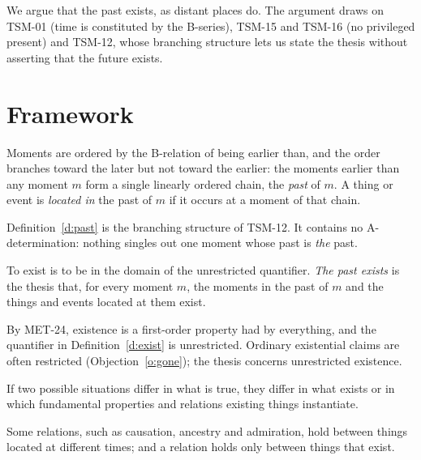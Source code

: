 \documentclass{situationist-preprint}
\begin{document}
We argue that the past exists, as distant places do. The argument draws on TSM-01 (time is constituted by the B-series), TSM-15 and TSM-16 (no privileged present) and TSM-12, whose branching structure lets us state the thesis without asserting that the future exists.

\section{Framework}

\begin{definition}\label{d:past}
Moments are ordered by the B-relation of being earlier than, and the order branches toward the later but not toward the earlier: the moments earlier than any moment $m$ form a single linearly ordered chain, the \emph{past} of $m$. A thing or event is \emph{located in} the past of $m$ if it occurs at a moment of that chain.
\end{definition}

Definition~\ref{d:past} is the branching structure of TSM-12. It contains no A-determination: nothing singles out one moment whose past is \emph{the} past.

\begin{definition}[Existence]\label{d:exist}
To exist is to be in the domain of the unrestricted quantifier. \emph{The past exists} is the thesis that, for every moment $m$, the moments in the past of $m$ and the things and events located at them exist.
\end{definition}

By MET-24, existence is a first-order property had by everything, and the quantifier in Definition~\ref{d:exist} is unrestricted. Ordinary existential claims are often restricted (Objection~\ref{o:gone}); the thesis concerns unrestricted existence.

\begin{principle}\label{p:tsb}
If two possible situations differ in what is true, they differ in what exists or in which fundamental properties and relations existing things instantiate.
\end{principle}

\begin{principle}\label{p:cross}
Some relations, such as causation, ancestry and admiration, hold between things located at different times; and a relation holds only between things that exist.
\end{principle}
\end{document}
